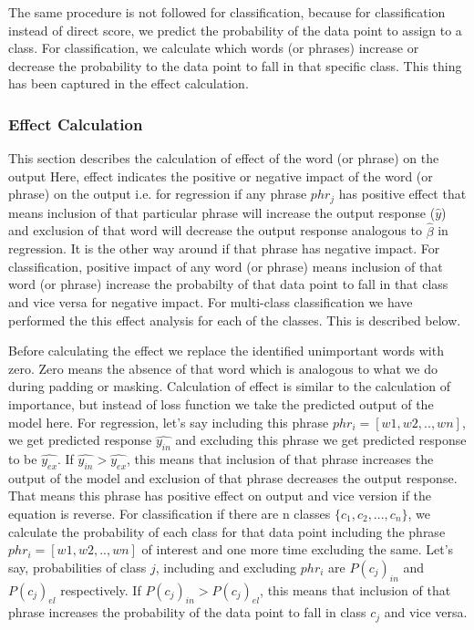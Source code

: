 \documentclass[11pt]{article}
\begin{document}
The same procedure is not followed for classification, because for classification instead of direct score, we predict the probability of the data point to assign to a class. For classification, we calculate which words (or phrases) increase or decrease the probability to the data point to fall in that specific class. This thing has been captured in the effect calculation.


\subsubsection{Effect Calculation}
This section describes the calculation of effect of the word (or phrase) on the output Here, effect indicates the positive or negative impact of the word (or phrase) on the output i.e. for regression if any phrase $phr_j$ has positive effect that means inclusion of that particular phrase will increase the output response ($\hat{y}$) and exclusion of that word will decrease the output response analogous to $\hat{\beta}$ in regression. It is the other way around if that phrase has negative impact. For classification, positive impact of any word (or phrase) means inclusion of that word (or phrase) increase the probabilty of that data point to fall in that class and vice versa for negative impact. For multi-class classification we have performed the this effect analysis for each of the classes. This is described below. 


Before calculating the effect we replace the identified unimportant words with zero. Zero means the absence of that word which is analogous to what we do during padding or masking. Calculation of effect is similar to the calculation of importance, but instead of loss function we take the predicted output of the model here. For regression, let's say including this phrase $phr_i = [w1,w2,..,wn]$, we get predicted response $\hat{y_{in}}$ and excluding this phrase we get predicted response to be $\hat{y_{ex}}$. If $\hat{y_{in}} > \hat{y_{ex}}$, this means that inclusion of that phrase increases the output of the model and exclusion of that phrase decreases the output response. That means this phrase has positive effect on output and vice version if the equation is reverse. For classification if there are n classes $\{c_1, c_2, ... , c_n\}$, we calculate the probability of each class for that data point including the phrase $phr_i = [w1,w2,..,wn]$ of interest and one more time excluding the same. Let's say, probabilities of class $j$, including and excluding $phr_i$ are $P(c_j)_{in}$  and $P(c_j)_{el}$ respectively. If $P(c_j)_{in} > P(c_j)_{el}$, this means that inclusion of that phrase increases the probability of the data point to fall in class $c_j$ and vice versa.
\end{document}
